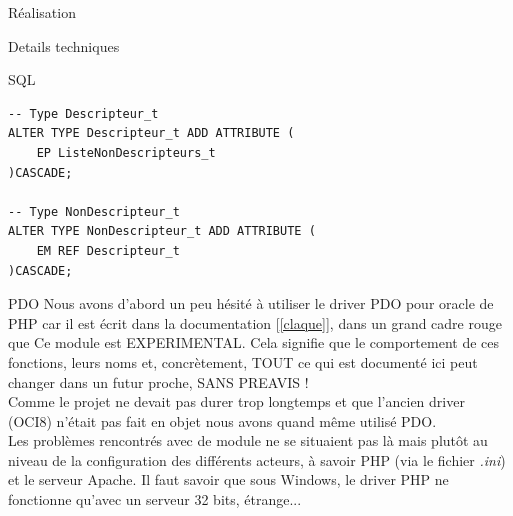 \documentclass[a4paper, 12pt]{report}
\begin{document}
\begin{chapter}{Réalisation}
\begin{section}{Details techniques}
\begin{subsection}{SQL}
\begin{verbatim}
-- Type Descripteur_t
ALTER TYPE Descripteur_t ADD ATTRIBUTE (
    EP ListeNonDescripteurs_t
)CASCADE;

-- Type NonDescripteur_t
ALTER TYPE NonDescripteur_t ADD ATTRIBUTE (
    EM REF Descripteur_t
)CASCADE;
			\end{verbatim}
		\end{subsection}

		\begin{subsection}{PDO}	
			Nous avons d'abord un peu hésité à utiliser le driver PDO pour oracle de PHP car il est écrit dans la documentation [\ref{claque}], 
			dans un grand cadre rouge que \og Ce module est EXPERIMENTAL. Cela signifie que le comportement de ces fonctions, leurs noms et, concrètement, TOUT ce qui est documenté ici peut changer dans un futur proche, SANS PREAVIS ! \fg \\
			Comme le projet ne devait pas durer trop longtemps et que l'ancien driver (OCI8) n'était pas fait en objet nous avons quand même utilisé PDO.\\

			Les problèmes rencontrés avec de module ne se situaient pas là mais plutôt au niveau de la configuration des 
			différents acteurs, à savoir PHP (via le fichier \emph{.ini}) et le serveur Apache. Il faut savoir que sous
			Windows, le driver PHP ne fonctionne qu'avec un serveur 32 bits, étrange...
		\end{subsection}
	\end{section}
\end{chapter}
\end{document}
